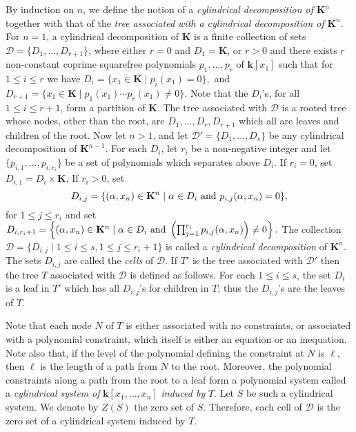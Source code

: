 \documentclass[10pt]{article}
\def\K {\ensuremath{\mathbf{k}}}
\def\KK {\ensuremath{\mathbf{K}}}
\def\DD {\ensuremath{\mathcal{D}}}
\def\TT {\ensuremath{T}}
\begin{document}
\smallskip{}
By induction on $n$,
we define the notion of a {\em cylindrical decomposition of} ${\KK}^n$
together with that of the {\em tree associated with a 
cylindrical decomposition of} ${\KK}^n$.
For $n=1$, a cylindrical decomposition of $\KK$ is a 
finite collection of sets ${\DD} = \{D_1,\ldots,D_{r+1}\}$, 
where either $r=0$ and $D_1=\KK$, or $r>0$ and
there exists $r$  non-constant coprime squarefree polynomials 
$p_1,\ldots,p_{r}$ of $\K[x_1]$ such that for $1\leq i\leq r$
we have 
$
D_i=\{x_1\in\KK\mid p_i(x_1)=0\}, 
$
and 
$
D_{r+1}=\{x_1\in\KK\mid p_1(x_1)\cdots p_r(x_1) \neq 0\}.
$
Note that the $D_i$'s, for all $1\leq i\leq {r+1}$, form a partition
of $\KK$. 
The tree associated  with ${\DD}$ is a rooted tree 
whose nodes, other than the root, are $D_1, \ldots, D_r, D_{r+1}$
which all are leaves and children of the root.
Now let $n>1$, and let ${\DD}'=\{D_1,\ldots,D_s\}$ be any cylindrical 
decomposition of $\KK^{n-1}$. For each $D_i$, 
let $r_i$ be a non-negative integer and 
let $\{p_{i,1},\ldots,p_{i,r_i}\}$ be a set of polynomials 
which separates above $D_i$. 
If $r_i=0$, set $D_{i,1}=D_i\times\KK$. 
If $r_i>0$, set
$$
D_{i,j}=\{(\alpha,x_n)\in\KK^n\mid \alpha\in D_i 
\ {\rm and} \  p_{i,j}(\alpha,x_n)=0\},
$$
for $1\leq j\leq r_i$ and set
$
D_{i,r_{i}+1}=\left\{(\alpha,x_n)\in\KK^n\mid \alpha\in D_i
\ {\rm and} \  \left(\prod_{j=1}^{r_i}p_{i,j}(\alpha,x_n)\right)\neq0\right\}.
$
The collection 
${\DD}=\{D_{i,j}\mid 1\leq i\leq s, 1\leq j\leq r_{i}+1\}$ is called a
{\em cylindrical decomposition} of $\KK^n$. 
The sets $D_{i,j}$ are called the {\em cells} of ${\DD}$.
If ${\TT}'$ is the tree associated with ${\DD}'$
then the tree ${\TT}$ associated with  ${\DD}$ is defined 
as follows.
For each $1\leq i\leq s$, the set $D_i$ is a leaf
in ${\TT}'$ which has all $D_{i,j}$'s for children 
in ${\TT}$; thus the $D_{i,j}$'s are the leaves of ${\TT}$.

Note that each node $N$ of ${\TT}$ is 
either associated with no constraints,
or associated with a polynomial
constraint, which itself is either an equation or an inequation.
Note also that, if the level of the polynomial defining the constraint
at $N$ is ${\ell}$, then ${\ell}$ is the length of a path
from $N$ to the root.
Moreover, the polynomial constraints
along a path from the root to a leaf form 
a polynomial system called a {\em cylindrical system}  
{\em of}  $\K[x_1,\ldots,x_n]$ {\em induced by} ${\TT}$.
Let $S$ be such a cylindrical system.
We denote by $Z(S)$ the zero set of $S$.
Therefore, each cell of ${\DD}$ is the zero set of a 
cylindrical system induced by ${\TT}$.
\end{document}
